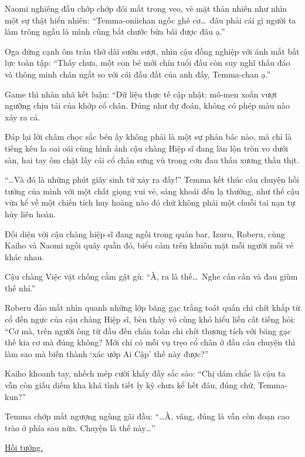 \documentclass[../main.tex]{subfiles}
\begin{document}
Naomi nghiêng đầu chớp chớp đôi mắt trong veo, vẻ mặt thản nhiên như nhìn một sự thật hiển nhiên: ``Temma-oniichan ngốc ghê cơ\dots\ đâu phải cái gì người ta làm trông ngầu là mình cũng bắt chước bừa bãi được đâu ạ.''

Oga đứng cạnh ôm trán thở dài sườn sượt, nhìn cậu đồng nghiệp với ánh mắt bất lực toàn tập: ``Thấy chưa, một con bé mới chín tuổi đầu còn suy nghĩ thấu đáo và thông minh chán ngắt so với cái đầu đất của anh đấy, Temma-chan ạ.''

Game thì nhàn nhã kết luận: ``Dữ liệu thực tế cập nhật: mô-men xoắn vượt ngưỡng chịu tải của khớp cổ chân. Đúng như dự đoán, không có phép màu nào xảy ra cả.

Đáp lại lời châm chọc sắc bén ấy không phải là một sự phản bác nào, mà chỉ là tiếng kêu la oai oái cùng hình ảnh cậu chàng Hiệp sĩ đang lăn lộn tròn vo dưới sàn, hai tay ôm chặt lấy cái cổ chân sưng vù trong cơn đau thấu xương thấu thịt.

\ct

``\dots Và đó là những phút giây sinh tử xảy ra đấy!'' Temma kết thúc câu chuyện hồi tưởng của mình với một chất giọng vui vẻ, sảng khoái đến lạ thường, như thể cậu vừa kể về một chiến tích huy hoàng nào đó chứ không phải một chuỗi tai nạn tự hủy liên hoàn.

Đối diện với cậu chàng hiệp sĩ đang ngồi trong quán bar, Izuru, Roberu, cùng Kaiho và Naomi ngồi quây quần đó, biểu cảm trên khuôn mặt mỗi người mỗi vẻ khác nhau.


Cậu chàng Việc vặt chống cằm gật gù: ``À, ra là thế\dots\ Nghe cấn cấn và đau giùm thế nhỉ.''

Roberu đảo mắt nhìn quanh những lớp băng gạc trắng toát quấn chi chít khắp từ cổ đến ngực của cậu chàng Hiệp sĩ, bèn thấy vô cùng khó hiểu liền cất tiếng hỏi: ``Cơ mà, trên người ông từ đầu đến chân toàn chi chít thương tích với băng gạc thế kia cơ mà đúng không? Mới chỉ có mỗi vụ trẹo cổ chân ở đầu câu chuyện thì làm sao mà biến thành `xác ướp Ai Cập' thế này được?''

Kaiho khoanh tay, nhếch mép cười khẩy đầy sắc sảo: ``Chị dám chắc là cậu ta vẫn còn giấu diếm kha khá tình tiết ly kỳ chưa kể hết đâu, đúng chứ, Temma-kun?''

Temma chớp mắt ngượng ngùng gãi đầu: ``\dots À, vâng, đúng là vẫn còn đoạn cao trào ở phía sau nữa. Chuyện là thế này\dots''

\begin{center}
    \uline{Hồi tưởng.}
\end{center}
\end{document}
